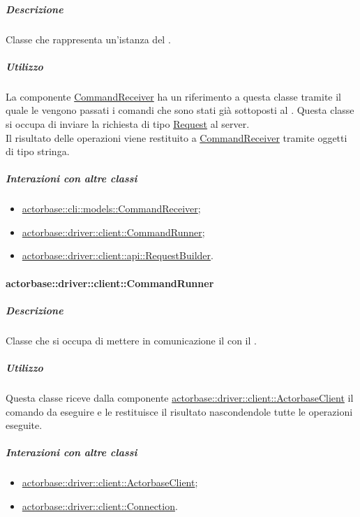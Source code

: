 \documentclass{scalatekids-article}
\begin{document}
\subparagraph{Descrizione}

Classe che rappresenta un'istanza del .

\subparagraph{Utilizzo}

La componente
\hyperref[sec:actorbase::cli::models::CommandReceiver]{CommandReceiver} ha un
riferimento a questa classe tramite il quale le vengono passati i comandi che
sono stati già sottoposti al . Questa classe si occupa di inviare
la richiesta di tipo
\hyperref[sec:actorbase::driver::client::api::Request]{Request} al server.\\ Il
risultato delle operazioni viene restituito a
\hyperref[sec:actorbase::cli::models::CommandReceiver]{CommandReceiver} tramite
oggetti di tipo stringa.

\subparagraph{Interazioni con altre classi}

\begin{itemize}
\item \hyperref[sec:actorbase::cli::models::CommandReceiver]{actorbase::cli::models::CommandReceiver};
\item \hyperref[sec:actorbase::driver::client::CommandRunner]{actorbase::driver::client::CommandRunner};
\item \hyperref[sec:actorbase::driver::client::api::RequestBuilder]{actorbase::driver::client::api::RequestBuilder}.
\end{itemize}
\paragraph{actorbase::driver::client::CommandRunner}
\label{sec:actorbase::driver::client::CommandRunner}

\subparagraph{Descrizione}

Classe  che si occupa di mettere in comunicazione il
 con il .

\subparagraph{Utilizzo}

Questa classe riceve dalla componente \hyperref[sec:actorbase::driver::client::ActorbaseClient]{actorbase::driver::client::ActorbaseClient}
il comando da eseguire e le restituisce il risultato nascondendole
tutte le operazioni eseguite.

\subparagraph{Interazioni con altre classi}

\begin{itemize}
\item \hyperref[sec:actorbase::driver::client::ActorbaseClient]{actorbase::driver::client::ActorbaseClient};
\item \hyperref[sec:actorbase::driver::client::Connection]{actorbase::driver::client::Connection}.
\end{itemize}
\end{document}
